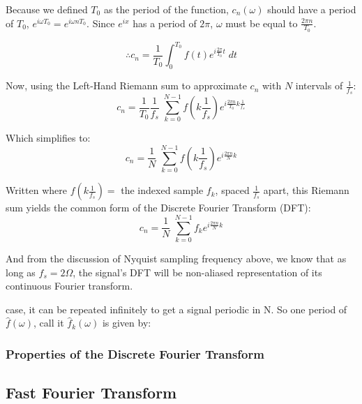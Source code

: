 \documentclass[12pt]{article}
\begin{document}
Because we defined \(T_0\) as the period of the function, \(c_{n}(\omega) \) 
should have a period of \( T_0\), \(e^{i\omega T_0} = e^{i\omega nT_0}\). Since 
\(e^{i x}\) has a period of \( 2\pi \), \( \omega \) must be equal to 
\(\frac{2\pi n}{T_0} \). 

\[ \therefore c_{n} = \frac{1}{T_0} \int_{0}^{T_0} f(t) e^{i \frac{2\pi}{T_0} t 
} \; dt\] 

Now, using the Left-Hand Riemann sum to approximate \( c_n\) with \( N\) 
intervals of \( \frac{1}{f_s} \):
\[ c_{n} = \frac{1}{T_0} \frac{1}{f_s} \; \sum_{k = 0}^{N-1} f(k \frac{1}{f_s}) 
e^{i \frac{2\pi n}{T_0} k\frac{1}{f_s}} \]

Which simplifies to:
\[ c_{n} = \frac{1}{N} \; \sum_{k = 0}^{N-1} f(k \frac{1}{f_s}) e^{i \frac{2\pi 
n}{N}k} \]

Written where \( f(k \frac{1}{f_s}) =\) the indexed sample \(f_k\), spaced 
\(\frac{1}{f_s}\) apart, this Riemann sum yields the common form of the 
Discrete Fourier Transform (DFT):
\[ c_{n} = \frac{1}{N} \; \sum_{k = 0}^{N-1} f_k e^{i \frac{2\pi n}{N}k} \]

And from the discussion of Nyquist sampling frequency above, we know that as 
long as \(f_s = 2\Omega\), the signal's DFT will be non-aliased representation 
of its continuous Fourier transform.

%
case, it can be repeated infinitely to get a signal periodic in N. So one 
period of \(\hat{f}(\omega) \), call it \(\hat{f}_{k}(\omega) \) is given by:
%


\subsubsection{Properties of the Discrete Fourier Transform}


\subsection{Fast Fourier Transform}
\end{document}
